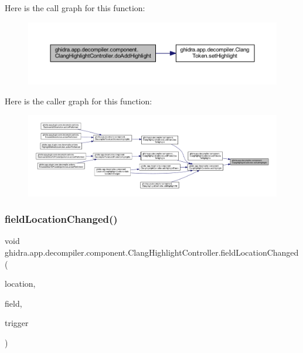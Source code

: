 Here is the call graph for this function\+:
\nopagebreak
\begin{figure}[H]
\begin{center}
\leavevmode
\includegraphics[width=350pt]{classghidra_1_1app_1_1decompiler_1_1component_1_1_clang_highlight_controller_adcaa163e6517db404fb5aee28b20b08d_cgraph}
\end{center}
\end{figure}
Here is the caller graph for this function\+:
\nopagebreak
\begin{figure}[H]
\begin{center}
\leavevmode
\includegraphics[width=350pt]{classghidra_1_1app_1_1decompiler_1_1component_1_1_clang_highlight_controller_adcaa163e6517db404fb5aee28b20b08d_icgraph}
\end{center}
\end{figure}
\mbox{\label{classghidra_1_1app_1_1decompiler_1_1component_1_1_clang_highlight_controller_a2a0cb731486fb81e3ba5f30a1df8ede9}} 
\subsubsection{\texorpdfstring{fieldLocationChanged()}{fieldLocationChanged()}}
{\footnotesize\ttfamily void ghidra.\+app.\+decompiler.\+component.\+Clang\+Highlight\+Controller.\+field\+Location\+Changed (\begin{DoxyParamCaption}\item[{Field\+Location}]{location,  }\item[{Field}]{field,  }\item[{Event\+Trigger}]{trigger }\end{DoxyParamCaption})\hspace{0.3cm}{\ttfamily [inline]}}



